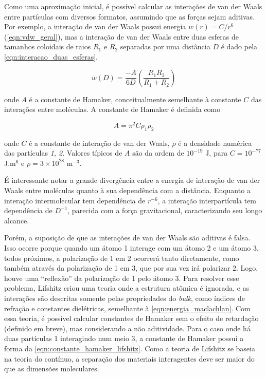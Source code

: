 	Como uma aproximação inicial, é possível calcular as interações de van der Waals entre partículas com diversos formatos, assumindo que as forças sejam aditivas. Por exemplo, a interação de van der Waals possui energia \(w(r) = C/r^6\) (\autoref{eqn:vdw_geral}), mas a interação de van der Waals entre duas esferas de tamanhos coloidais de raios \(R_1\) e \(R_2\) separadas por uma distância \(D\) é dado pela \autoref{eqn:interacao_duas_esferas}. 
	
	\begin{equation}
		w(D) = \dfrac{-A}{6D} \left( \dfrac{R_1R_2}{R_1 + R_2}   \right)
		\label{eqn:interacao_duas_esferas}
	\end{equation}
	
	\noindent onde \(A\) é a constante de Hamaker, conceitualmente semelhante à constante \(C\) das interações entre moléculas. A constante de Hamaker é definida como 
	
	\begin{equation}
		A = \pi^2 C \rho_1 \rho_2
		\label{eqn:constante_hamaker}
	\end{equation}
	
	\noindent onde \(C\) é a constante de interação de van der Waals, \(\rho\) é a densidade numérica das partículas \emph{1, 2}. Valores típicos de \(A\) são da ordem de \(10^{-19}\) J, para \(C = 10^{-77}\) J.m\(^6\) e \(\rho=3 \times 10^{28}\) m\(^{-3}\).
	
	É interessante notar a grande divergência entre a energia de interação de van der Waals entre moléculas quanto à sua dependência com a distância. Enquanto a interação intermolecular tem dependência de \(r^{-6}\), a interação interpartícula tem dependência de \(D^{-1}\), parecida com a força gravitacional, caracterizando seu longo alcance.

	Porém, a suposição de que as interações de van der Waals são aditivas é falsa. Isso ocorre porque quando um átomo 1 interage com um átomo 2 e um átomo 3, todos próximos, a polarização de 1 em 2 ocorrerá tanto diretamente, como também através da polarização de 1 em 3, que por sua vez irá polarizar 2. Logo, houve uma ``reflexão'' da polarização de 1 pelo átomo 3. Para resolver esse problema, Lifshitz  criou uma teoria onde a estrutura atômica é ignorada, e as interações são descritas somente pelas propriedades do \emph{bulk}, como índices de refração e constantes dielétricas, semelhante à \autoref{eqn:energia_maclachlan}. Com essa teoria, é possível calcular constantes de Hamaker sem o efeito de retardação (definido em breve), mas considerando a não aditividade. Para o caso onde há duas partículas 1 interagindo num meio 3, a constante de Hamaker possui a forma da \autoref{eqn:constante_hamaker_lifshitz}. Como a teoria de Lifshitz se baseia na teoria do contínuo, a separação dos materiais interagentes deve ser maior do que as dimensões moleculares.
	
